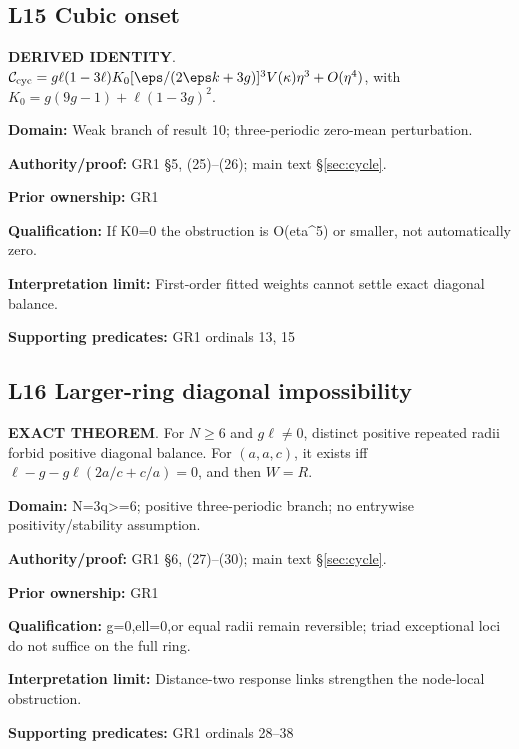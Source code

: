 \par\noindent\begin{minipage}{\linewidth}
\subsection*{L15 Cubic onset}
\textbf{DERIVED IDENTITY}. \(\mathcal C_{\rm cyc}=g\ell(1-3\ell)K_0[\eps/(2\eps k+3g)]^3V(\kappa)\eta^3+O(\eta^4)\), with \(K_0=g(9g-1)+\ell(1-3g)^2\).\par
\textbf{Domain:} Weak branch of result 10; three-periodic zero-mean perturbation.\par
\textbf{Authority/proof:} GR1 \S{}5, (25)--(26); main text \S\ref{sec:cycle}.\par
\textbf{Prior ownership:} GR1\par
\textbf{Qualification:} If K0=0 the obstruction is O(eta\textasciicircum{}5) or smaller, not automatically zero.\par
\textbf{Interpretation limit:} First-order fitted weights cannot settle exact diagonal balance.\par
\textbf{Supporting predicates:} GR1 ordinals 13, 15\par
\end{minipage}\par\medskip
\par\noindent\begin{minipage}{\linewidth}
\subsection*{L16 Larger-ring diagonal impossibility}
\textbf{EXACT THEOREM}. For \(N\ge6\) and \(g\ell\ne0\), distinct positive repeated radii forbid positive diagonal balance. For \((a,a,c)\), it exists iff \(\ell-g-g\ell(2a/c+c/a)=0\), and then \(W=R\).\par
\textbf{Domain:} N=3q>=6; positive three-periodic branch; no entrywise positivity/stability assumption.\par
\textbf{Authority/proof:} GR1 \S{}6, (27)--(30); main text \S\ref{sec:cycle}.\par
\textbf{Prior ownership:} GR1\par
\textbf{Qualification:} g=0,ell=0,or equal radii remain reversible; triad exceptional loci do not suffice on the full ring.\par
\textbf{Interpretation limit:} Distance-two response links strengthen the node-local obstruction.\par
\textbf{Supporting predicates:} GR1 ordinals 28--38\par
\end{minipage}\par\medskip
